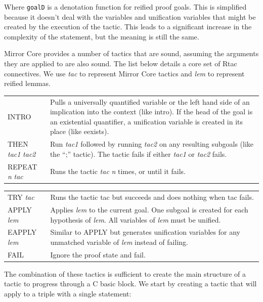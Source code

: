 \documentclass{puthesis}
\begin{document}
Where \lstinline|goalD| is a denotation function for reified proof
goals. This is simplified because it doesn't deal with the variables
and unification variables that might be created by the execution of
the tactic. This leads to a significant increase in the complexity of
the statement, but the meaning is still the same.

Mirror Core provides a number of tactics that are sound, assuming the
arguments they are applied to are also sound. 
The list below details a core set of Rtac connectives. We use 
{\it tac} to represent Mirror Core tactics and {\it lem} to represent reified lemmas.

\vspace{5mm}

\noindent \begin{tabular}{l@{\quad\quad}p{90mm}}
{\sf INTRO} & Pulls a universally quantified variable or the left hand
side of an
implication into the context (like {\sf intro}). If the head of the goal is an existential
quantifier, a unification variable is created in its place (like {\sf
  eexists}). \\
{\sf THEN} {\it tac1} {\it tac2} & Run {\it tac1} followed by running {\it
  tac2} on any resulting subgoals (like the ``{\sf ;}'' tactic). The tactic fails if either 
  {\it tac1} or {\it tac2} fails.\\
{\sf REPEAT} {\it n} {\it tac} & Runs the tactic {\it tac} {\it n}
times, or until it fails. \\
\end{tabular}

\noindent \begin{tabular}{l@{\quad\quad}p{90mm}}
{\sf TRY} {\it tac} & Runs the tactic {\sf tac} but succeeds and does
nothing when {\sf tac} fails.\\
{\sf APPLY} {\it lem} & Applies {\it lem} to the current goal. One
subgoal is created for each hypothesis of {\it lem}. All variables of
{\it lem} must be unified.\\
{\sf EAPPLY} {\it lem} & Similar to {\sf APPLY} but generates
unification variables for any unmatched variable of {\it lem} instead
of failing. \\
{\sf FAIL} & Ignore the proof state and fail. \\ 
\end{tabular}

The combination of these tactics is sufficient to create the main
structure of a tactic to progress through a C basic block. We start by
creating a tactic that will apply to a triple with a single statement:
\end{document}
